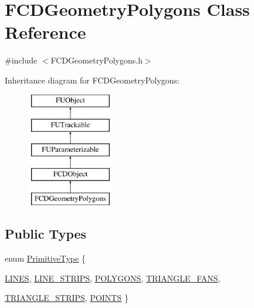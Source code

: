\hypertarget{classFCDGeometryPolygons}{
\section{FCDGeometryPolygons Class Reference}
\label{classFCDGeometryPolygons}
}


{\ttfamily \#include $<$FCDGeometryPolygons.h$>$}

Inheritance diagram for FCDGeometryPolygons:\begin{figure}[H]
\begin{center}
\leavevmode
\includegraphics[height=5.000000cm]{classFCDGeometryPolygons}
\end{center}
\end{figure}
\subsection*{Public Types}
\begin{DoxyCompactItemize}
\item 
enum \hyperlink{classFCDGeometryPolygons_a78fd93579665ea37c6d3396f4c4e8fac}{PrimitiveType} \{ \par
\hyperlink{classFCDGeometryPolygons_a78fd93579665ea37c6d3396f4c4e8faca19d3a4978cdce03bf99f36e7fd9b8f8c}{LINES}, 
\hyperlink{classFCDGeometryPolygons_a78fd93579665ea37c6d3396f4c4e8faca4f7e50d887fd20ae05131b31d30061e7}{LINE\_\-STRIPS}, 
\hyperlink{classFCDGeometryPolygons_a78fd93579665ea37c6d3396f4c4e8facac6923b1ee08ce77a7c973a4136b86989}{POLYGONS}, 
\hyperlink{classFCDGeometryPolygons_a78fd93579665ea37c6d3396f4c4e8facaed47201a0dbf1782843319e2fb7f3ef9}{TRIANGLE\_\-FANS}, 
\par
\hyperlink{classFCDGeometryPolygons_a78fd93579665ea37c6d3396f4c4e8facada4edb89695314d4168086fd07c62dd7}{TRIANGLE\_\-STRIPS}, 
\hyperlink{classFCDGeometryPolygons_a78fd93579665ea37c6d3396f4c4e8facadef536297623ef77c09b5d7d50e72d04}{POINTS}
 \}
\end{DoxyCompactItemize}
